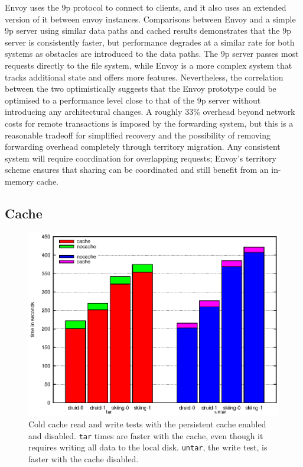 Envoy uses the 9p protocol to connect to clients, and it also uses an extended version of it between envoy instances. Comparisons between Envoy and a simple 9p server using similar data paths and cached results demonstrates that the 9p server is consistently faster, but performance degrades at a similar rate for both systems as obstacles are introduced to the data paths. The 9p server passes most requests directly to the file system, while Envoy is a more complex system that tracks additional state and offers more features. Nevertheless, the correlation between the two optimistically suggests that the Envoy prototype could be optimised to a performance level close to that of the 9p server without introducing any architectural changes. A roughly 33\% overhead beyond network costs for remote transactions is imposed by the forwarding system, but this is a reasonable tradeoff for simplified recovery and the possibility of removing forwarding overhead completely through territory migration. Any consistent system will require coordination for overlapping requests; Envoy's territory scheme ensures that sharing can be coordinated and still benefit from an in-memory cache.

\subsection{Cache}

\begin{figure}[t]
\centering
\includegraphics[width=\figwidth]{figures/envoy-cold-vs-nocache}
\caption[Cold cache results with and without persistent cache]{Cold cache read and write tests with the persistent cache enabled and disabled. \texttt{tar} times are faster with the cache, even though it requires writing all data to the local disk. \texttt{untar}, the write test, is faster with the cache disabled.}
\label{fig:envoy-cold-vs-nocache}
\end{figure}

